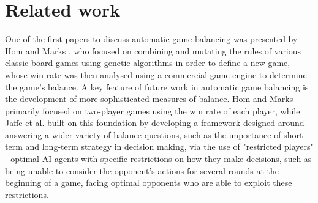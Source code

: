 % 
% 

\section{Related work}


\label{back:related}

One of the first papers to discuss automatic game balancing was presented by Hom and Marks \cite{hom_automatic_2007}, who focused on combining and mutating the rules of various classic board games using genetic algorithms in order to define a new game, whose win rate was then analysed using a commercial game engine to determine the game's balance. A key feature of future work in automatic game balancing is the development of more sophisticated measures of balance. Hom and Marks primarily focused on two-player games using the win rate of each player, while Jaffe et al. \cite{jaffe_evaluating_2012} built on this foundation by developing a framework designed around answering a wider variety of balance questions, such as the importance of short-term and long-term strategy in decision making, via the use of "restricted players" - optimal AI agents with specific restrictions on how they make decisions, such as being unable to consider the opponent's actions for several rounds at the beginning of a game, facing optimal opponents who are able to exploit these restrictions.

